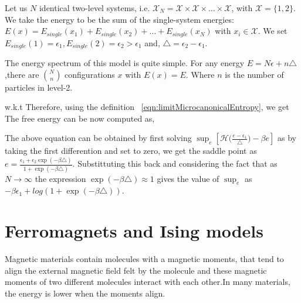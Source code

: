 \documentclass[letterpaper,english,12pt]{article}
\begin{document}
\begin{shaded*} 
\begin{exmp}
Let us $N$ identical two-level systems, i.e. $\mathcal{X} _N = \mathcal{X} \times \mathcal{X}  \times \ldots \times \mathcal{X}$, with $\mathcal{X} = \{1,2\}$. We take the energy to be the sum of the single-system energies: $E(x) = E_{single}(x_1) + E_{single}(x_2) + \ldots + E_{single}(x_N) $ with $x_i \in \mathcal{X}$. We set $E_{single}(1) = \epsilon_1, E_{single}(2) = \epsilon_2 > \epsilon_1$ and, $\triangle = \epsilon_2 - \epsilon_1$.

The energy spectrum of this model is quite simple. For any energy $E = N \epsilon + n\triangle$,there are $\binom{N}{n}$ configurations $x$ with $E(x) = E$. 
Where $n$ is the number of particles in level-2.

w.k.t 
Therefore, using the definition ~\eqref{eqn:limitMicrocanonicalEntropy}, we get
The free energy can be now computed as,

The above equation can be obtained by first solving $ \sup_e [\mathcal{H}\Big(\frac{e-\epsilon_1}{\triangle}\Big) -\beta e]$ as by taking the first differention and set to zero, we get the saddle point as $ e=\frac{\epsilon_1 + \epsilon_2 \exp(-\beta \triangle)}{1+\exp(-\beta \triangle)}$. Substittuting this back and considering the fact that as $N \rightarrow \infty$ the expression $\exp(-\beta \triangle) \approx 1$ gives the value of $\sup_e$ as $-\beta\epsilon_1+log (1+\exp(-\beta \triangle))$.
\end{exmp}
\end{shaded*}


\section{Ferromagnets and Ising models}
Magnetic materials contain molecules with a magnetic moments, that tend to align the external magnetic field felt by the molecule and these magnetic moments of two different molecules interact with each other.In many materials, the energy is lower when the moments align. 
\end{document}
